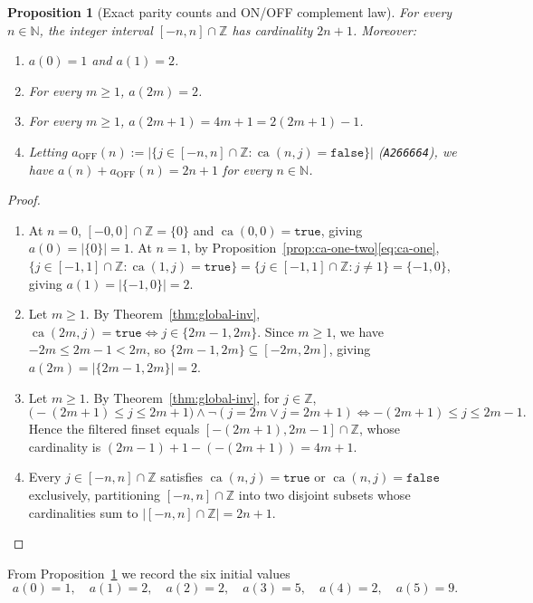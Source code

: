 \documentclass[11pt]{article}
\newtheorem{proposition}[theorem]{Proposition}
\theoremstyle{definition}
\newcommand{\N}{\mathbb{N}}
\newcommand{\Z}{\mathbb{Z}}
\newcommand{\seq}[1]{\texttt{#1}}
\newcommand{\ca}{\operatorname{ca}}
\begin{document}
\begin{proposition}[Exact parity counts and ON/OFF complement law]
\label{prop:counts}
For every $n \in \N$, the integer interval $[-n, n] \cap \Z$ has cardinality $2n + 1$. Moreover:
\begin{enumerate}
\item[\textup{(a)}] $a(0) = 1$ and $a(1) = 2$.
\item[\textup{(b)}] For every $m \ge 1$, $a(2m) = 2$.
\item[\textup{(c)}] For every $m \ge 1$, $a(2m + 1) = 4m + 1 = 2(2m + 1) - 1$.
\item[\textup{(d)}] Letting $a_{\mathrm{OFF}}(n) := |\{j \in [-n, n] \cap \Z : \ca(n, j) = \mathtt{false}\}|$ (\seq{A266664}), we have $a(n) + a_{\mathrm{OFF}}(n) = 2n + 1$ for every $n \in \N$.
\end{enumerate}
\end{proposition}

\begin{proof}
\begin{enumerate}
\item[\textup{(a)}] At $n = 0$, $[-0, 0] \cap \Z = \{0\}$ and $\ca(0, 0) = \mathtt{true}$, giving $a(0) = |\{0\}| = 1$. At $n = 1$, by Proposition~\ref{prop:ca-one-two}\eqref{eq:ca-one}, $\{j \in [-1, 1] \cap \Z : \ca(1, j) = \mathtt{true}\} = \{j \in [-1, 1] \cap \Z : j \ne 1\} = \{-1, 0\}$, giving $a(1) = |\{-1, 0\}| = 2$.
\item[\textup{(b)}] Let $m \ge 1$. By Theorem~\ref{thm:global-inv}, $\ca(2m, j) = \mathtt{true} \iff j \in \{2m - 1, 2m\}$. Since $m \ge 1$, we have $-2m \le 2m - 1 < 2m$, so $\{2m - 1, 2m\} \subseteq [-2m, 2m]$, giving $a(2m) = |\{2m - 1, 2m\}| = 2$.
\item[\textup{(c)}] Let $m \ge 1$. By Theorem~\ref{thm:global-inv}, for $j \in \Z$,
\[
\bigl(-(2m + 1) \le j \le 2m + 1\bigr) \land \neg(j = 2m \lor j = 2m + 1) \iff -(2m + 1) \le j \le 2m - 1.
\]
Hence the filtered finset equals $[-(2m + 1), 2m - 1] \cap \Z$, whose cardinality is $(2m - 1) + 1 - (-(2m + 1)) = 4m + 1$.
\item[\textup{(d)}] Every $j \in [-n, n] \cap \Z$ satisfies $\ca(n, j) = \mathtt{true}$ or $\ca(n, j) = \mathtt{false}$ exclusively, partitioning $[-n, n] \cap \Z$ into two disjoint subsets whose cardinalities sum to $|[-n, n] \cap \Z| = 2n + 1$. \qedhere
\end{enumerate}
\end{proof}

From Proposition~\ref{prop:counts} we record the six initial values
\begin{equation}
\label{eq:init-vals}
a(0) = 1, \quad a(1) = 2, \quad a(2) = 2, \quad a(3) = 5, \quad a(4) = 2, \quad a(5) = 9.
\end{equation}
\end{document}

